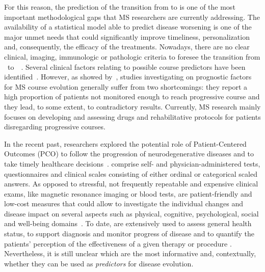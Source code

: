 For this reason, the prediction of the transition from \RR to \SP is one of the most important methodological gaps that MS researchers are currently addressing.
The availability of a statistical model able to predict disease worsening is one of the major unmet needs that could significantly improve timeliness, personalization and, consequently, the efficacy of the treatments.
Nowadays, there are no clear clinical, imaging, immunologic or pathologic criteria to foresee the transition from \RR~to~\SP~\cite{lublin2014defining}. Several clinical factors relating to possible \SP course predictors have been identified~\cite{bergamaschi2015bremso, dickens2014type}.
However, as showed by~\cite{vukusic2003prognostic}, studies investigating on prognostic factors for MS course evolution generally suffer from two shortcomings: they
report a high proportion of \RR patients not monitored enough to reach progressive course and they lead, to some extent, to contradictory results.
Currently, MS research mainly focuses on developing and assessing drugs and rehabilitative protocols for \RR patients disregarding progressive courses.


In the recent past, researchers explored the potential role of Patient-Centered Outcomes (\ac{PCO}) to follow the progression of neurodegenerative diseases and  to take timely healthcare decisions~\cite{black2013patient}. %
\PCOs comprise self- and physician-administered tests, questionnaires and clinical scales consisting of either ordinal or categorical scaled answers.
As opposed to stressful, not frequently repeatable and expensive clinical exams, like magnetic resonance imaging or blood tests, \PCOs are patient-friendly and low-cost measures that could allow to investigate the individual changes and disease impact on several aspects such as physical, cognitive, psychological, social and well-being domains~\cite{fiorini2015machine}.
To date, \PCOs are extensively used to assess general health status, to support diagnosis and monitor progress of disease and to quantify the patients' perception of the effectiveness of a given therapy or procedure \cite{nelson2015patient}.
Nevertheless, it is still unclear which are the most informative \PCOs and, contextually, whether they can be used as {\em predictors} for disease evolution.

